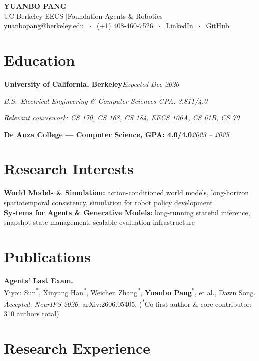 \documentclass[9pt, letterpaper]{extarticle}
\newcommand{\role}[2]{%
  \vspace{2pt}%
  \noindent\textbf{#1}\hfill\textit{#2}\par\vspace{1pt}%
}
\newcommand{\rolesub}[1]{%
  \noindent\textit{#1}\par\vspace{1pt}%
}
\begin{document}
\begin{center}
  {\LARGE\bfseries YUANBO PANG}\\[2pt]
  {\large UC Berkeley EECS \quad$\vert$\quad Foundation Agents \& Robotics}\\[2pt]
  \href{mailto:yuanbopang@berkeley.edu}{yuanbopang@berkeley.edu}
  $\;\cdot\;$ (+1) 408-460-7526
  $\;\cdot\;$ \href{https://www.linkedin.com/in/yuanbopang/}{LinkedIn}
  $\;\cdot\;$ \href{https://github.com/yuanboP}{GitHub}
\end{center}

\section{Education}
\role{University of California, Berkeley}{Expected Dec 2026}
\rolesub{B.S.\ Electrical Engineering \& Computer Sciences \quad GPA: 3.811/4.0}
\rolesub{Relevant coursework: CS 170, CS 168, CS 184, EECS 106A, CS 61B, CS 70}
\role{De Anza College --- Computer Science, GPA: 4.0/4.0}{2023 -- 2025}

\section{Research Interests}
\textbf{World Models \& Simulation:} action-conditioned world models, long-horizon spatiotemporal consistency, simulation for robot policy development\\[2pt]
\textbf{Systems for Agents \& Generative Models:} long-running stateful inference, snapshot state management, scalable evaluation infrastructure

\section{Publications}
\textbf{Agents' Last Exam.}\\[1pt]
Yiyou Sun\textsuperscript{*}, Xinyang Han\textsuperscript{*}, Weichen Zhang\textsuperscript{*}, \textbf{Yuanbo Pang}\textsuperscript{*}, et al., Dawn Song. \textit{Accepted, NeurIPS 2026.} \href{https://arxiv.org/abs/2606.05405}{arXiv:2606.05405}. \quad(\textsuperscript{*}Co-first author \& core contributor; 310 authors total)

\section{Research Experience}
\end{document}
